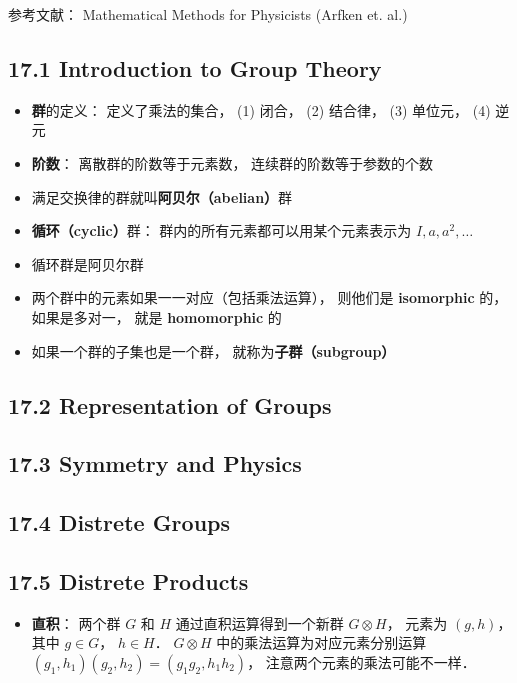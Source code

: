 
参考文献： Mathematical Methods for Physicists (Arfken et. al.)

\subsection{17.1 Introduction to Group Theory}
\begin{itemize}
\item \textbf{群}的定义： 定义了乘法的集合， (1) 闭合， (2) 结合律， (3) 单位元， (4) 逆元

\item \textbf{阶数}： 离散群的阶数等于元素数， 连续群的阶数等于参数的个数

\item 满足交换律的群就叫\textbf{阿贝尔（abelian）}群

\item \textbf{循环（cyclic）}群： 群内的所有元素都可以用某个元素表示为 $I, a, a^2, \dots$

\item 循环群是阿贝尔群

\item 两个群中的元素如果一一对应（包括乘法运算）， 则他们是 \textbf{isomorphic} 的， 如果是多对一， 就是 \textbf{homomorphic} 的

\item 如果一个群的子集也是一个群， 就称为\textbf{子群（subgroup）}
\end{itemize}

\subsection{17.2 Representation of Groups}

\subsection{17.3 Symmetry and Physics}

\subsection{17.4 Distrete Groups}

\subsection{17.5 Distrete Products}
\begin{itemize}
\item \textbf{直积}： 两个群 $G$ 和 $H$ 通过直积运算得到一个新群 $G \otimes H$， 元素为 $(g, h)$， 其中 $g\in G$， $h\in H$． $G \otimes H$ 中的乘法运算为对应元素分别运算 $(g_1, h_1)(g_2, h_2) = (g_1 g_2, h_1 h_2)$， 注意两个元素的乘法可能不一样．
\end{itemize}

